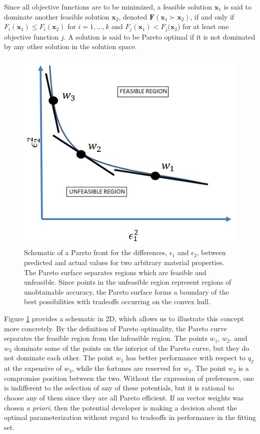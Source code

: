 Since all objective functions are to be minimized, a feasible solution $\bm{x}_1$ is said to dominate another feasible solution $\bm{x}_2$, denoted $\bm{F}(\bm{x}_1 \succ \bm{x}_2)$, if and only if $F_i(\bm{x}_1)\leq F_i(\bm{x}_2)$ for $i = 1,...,k$ and $F_j(\bm{x}_1)< F_j(\bm{x}_2$) for at least one objective function $j$.  A solution is said to be Pareto optimal if it is not dominated by any other solution in the solution space.

\begin{figure}[h]
	\centering
  \includegraphics{chapter3/pareto_schematic}
  \caption{Schematic of a Pareto front for the differences, $\epsilon_1$ and $\epsilon_2$, between predicted and actual values for two arbitrary material properties.  The Pareto surface separates regions which are feasible and unfeasible.  Since points in the unfeasible region represent regions of unobtainable accuracy, the Pareto surface forms a boundary of the best possibilities with tradeoffs occurring on the convex hull. }
  \label{fig:pareto_convex}
\end{figure}

Figure \ref{fig:pareto_convex} provides a schematic in 2D, which allows us to illustrate this concept more concretely.  By the definition of Pareto optimality, the Pareto curve separates the feasible region from the infeasible region.  The points $w_1$, $w_2$. amd $w_3$ dominate some of the points on the interior of the Pareto curve, but they do not dominate each other.  The point $w_1$ has better performance with respect to $q_2$ at the expensive of $w_3$, while the fortunes are reserved for $w_3$.  The point $w_2$ is a compromise position between the two.  Without the expression of preferences, one is indifferent to the selection of any of these potentials, but it is rational to choose any of them since they are all Pareto efficient.  If an vector weights was chosen \emph{a priori}, then the potential developer is making a decision about the optimal parameterization without regard to tradeoffs in performance in the fitting set.

